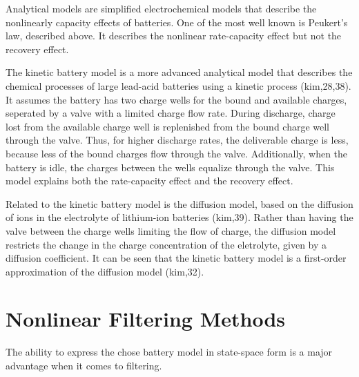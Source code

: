 Analytical models are simplified electrochemical models that describe the nonlinearly capacity effects of batteries. One of the most well known is Peukert's law, described above. It describes the nonlinear rate-capacity effect but not the recovery effect.

The kinetic battery model is a more advanced analytical model that describes the chemical processes of large lead-acid batteries using a kinetic process (kim,28,38). It assumes the battery has two charge wells for the bound and available charges, seperated by a valve with a limited charge flow rate. During discharge, charge lost from the available charge well is replenished from the bound charge well through the valve. Thus, for higher discharge rates, the deliverable charge is less, because less of the bound charges flow through the valve. Additionally, when the battery is idle, the charges between the wells equalize through the valve. This model explains both the rate-capacity effect and the recovery effect.

Related to the kinetic battery model is the diffusion model, based on the diffusion of ions in the electrolyte of lithium-ion batteries (kim,39). Rather than having the valve between the charge wells limiting the flow of charge, the diffusion model restricts the change in the charge concentration of the eletrolyte, given by a diffusion coefficient. It can be seen that the kinetic battery model is a first-order approximation of the diffusion model (kim,32).


\section{Nonlinear Filtering Methods}

The ability to express the chose battery model in state-space form is a major advantage when it comes to filtering. %
